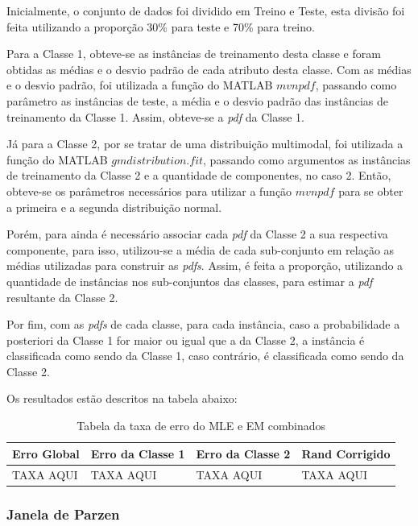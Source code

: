 Inicialmente, o conjunto de dados foi dividido em Treino e Teste, esta divisão foi feita utilizando a proporção 30\% para teste e 70\% para treino.

Para a Classe 1, obteve-se as instâncias de treinamento desta classe e foram obtidas as médias e o desvio padrão de cada atributo desta classe. Com as médias e o desvio padrão, foi utilizada a função do MATLAB $mvnpdf$, passando como parâmetro as instâncias de teste, a média e o desvio padrão das instâncias de treinamento da Classe 1. Assim, obteve-se a \textit{pdf} da Classe 1.

Já para a Classe 2, por se tratar de uma distribuição multimodal, foi utilizada a função do MATLAB $gmdistribution.fit$, passando como argumentos as instâncias de treinamento da Classe 2 e a quantidade de componentes, no caso 2. Então, obteve-se os parâmetros necessários para utilizar a função $mvnpdf$ para se obter a primeira e a segunda distribuição normal.

Porém, para ainda é necessário associar cada \textit{pdf} da Classe 2 a sua respectiva componente, para isso, utilizou-se a média de cada sub-conjunto em relação as médias utilizadas para construir as \textit{pdfs}. Assim, é feita a proporção, utilizando a quantidade de instâncias nos sub-conjuntos das classes, para estimar a \textit{pdf} resultante da Classe 2.

Por fim, com as \textit{pdfs} de cada classe, para cada instância, caso a probabilidade a posteriori da Classe 1 for maior ou igual que a da Classe 2, a instância é classificada como sendo da Classe 1, caso contrário, é classificada como sendo da Classe 2.

Os resultados estão descritos na tabela abaixo:

\begin{table}[H]
\begin{center}
\begin{tabular}{|l|l|l|l|}
\hline
Erro Global	&	Erro da Classe 1	&	Erro da Classe 2	&	Rand Corrigido	\\
\hline %
TAXA AQUI	&		TAXA AQUI		&		TAXA AQUI		&	TAXA AQUI		\\
\hline
\end{tabular}%
\end{center}   %
\caption{Tabela da taxa de erro do MLE e EM combinados}
\label{tab:erro-mle-em}
\end{table}

\subsubsection{Janela de Parzen}
\label{subsubsec:exp-janeladeparzen}









